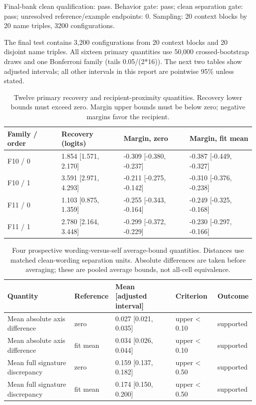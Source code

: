 Final-bank clean qualification: pass. Behavior gate: pass; clean separation gate: pass; unresolved reference/example endpoints: 0. Sampling: 20 context blocks by 20 name triples, 3200 configurations.

The final test contains 3,200 configurations from 20 context blocks and 20 disjoint name triples. All sixteen primary quantities use 50,000 crossed-bootstrap draws and one Bonferroni family (tails 0.05/(2*16)). The next two tables show adjusted intervals; all other intervals in this report are pointwise 95\% unless stated.

\begin{table}[htbp]
\centering\footnotesize
\caption{Twelve primary recovery and recipient-proximity quantities. Recovery lower bounds must exceed zero. Margin upper bounds must be below zero; negative margins favor the recipient.}
\label{tab:b007-primary-repair}
\begin{tabularx}{\linewidth}{@{}YYYY@{}}
\toprule
Family / order & Recovery (logits) & Margin, zero & Margin, fit mean \\
\midrule
F10 / 0 & 1.854 [1.571, 2.170] & -0.309 [-0.380, -0.237] & -0.387 [-0.449, -0.327] \\
F10 / 1 & 3.591 [2.971, 4.293] & -0.211 [-0.275, -0.142] & -0.310 [-0.376, -0.238] \\
F11 / 0 & 1.103 [0.875, 1.359] & -0.255 [-0.343, -0.164] & -0.249 [-0.325, -0.168] \\
F11 / 1 & 2.780 [2.164, 3.448] & -0.299 [-0.372, -0.229] & -0.230 [-0.297, -0.166] \\
\bottomrule
\end{tabularx}
\end{table}

\begin{table}[htbp]
\centering\footnotesize
\caption{Four prospective wording-versus-self average-bound quantities. Distances use matched clean-wording separation units. Absolute differences are taken before averaging; these are pooled average bounds, not all-cell equivalence.}
\label{tab:b007-primary-similarity}
\begin{tabularx}{\linewidth}{@{}YYYYY@{}}
\toprule
Quantity & Reference & Mean [adjusted interval] & Criterion & Outcome \\
\midrule
Mean absolute axis difference & zero & 0.027 [0.021, 0.035] & upper < 0.10 & supported \\
Mean absolute axis difference & fit mean & 0.034 [0.026, 0.044] & upper < 0.10 & supported \\
Mean full signature discrepancy & zero & 0.159 [0.137, 0.182] & upper < 0.50 & supported \\
Mean full signature discrepancy & fit mean & 0.174 [0.150, 0.200] & upper < 0.50 & supported \\
\bottomrule
\end{tabularx}
\end{table}

